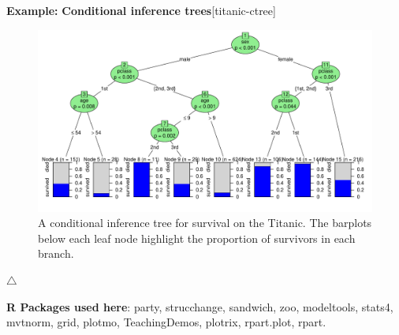 \documentclass{article}
\newenvironment{knitrout}{}{} %
\let\proglang=\textsf
\newcommand{\R}{\proglang{R}\xspace}
\newenvironment{Example}[2][unnamed-example]%
  {\medskip\noindent\textbf{\textsf{Example:}}
   \textbf{#2}\hfill [#1]\par\smallskip
  }
  {\hfill $\triangle$}
\begin{document}
\begin{Example}[titanic-ctree]{Conditional inference trees}
\begin{knitrout}
\begin{figure}[hbt!]
{\centering \includegraphics[width=\linewidth]{figure/titanic-ctree-1} 

}

\caption[A conditional inference tree for survival on the Titanic]{A conditional inference tree for survival on the Titanic. The barplots below each leaf node highlight the proportion of survivors in each branch.}\label{fig:titanic-ctree}
\end{figure}


\end{knitrout}
\end{Example}




\bigskip\noindent
\textbf{\R Packages used here}: \textsf{party, strucchange, sandwich, zoo, modeltools, stats4, mvtnorm, grid, plotmo, TeachingDemos, plotrix, rpart.plot, rpart}.




\end{document}
